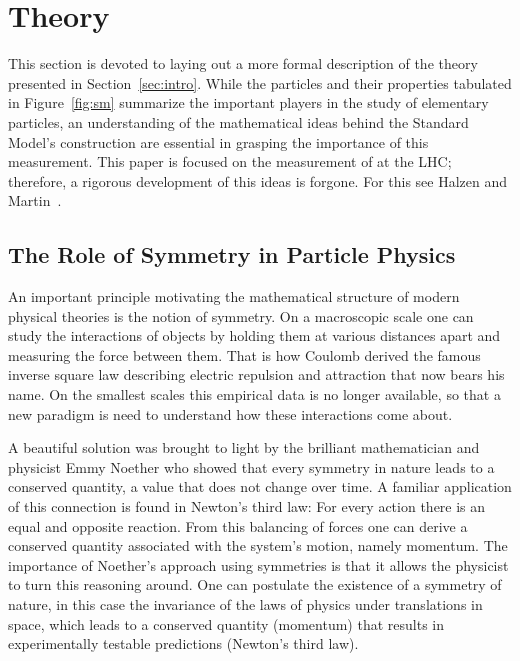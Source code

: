 \section{Theory}
\label{sec:theory}

This section is devoted to laying out a more formal description of the
theory presented in Section~\ref{sec:intro}. While the particles and
their properties tabulated in Figure~\ref{fig:sm} summarize the important
players in the study of elementary particles, an understanding of the
mathematical ideas behind the Standard Model's construction are essential in grasping
the importance of this measurement. This paper is focused on the measurement
of \HToZg at the LHC; therefore, a rigorous development of this ideas is forgone. 
For this see Halzen and Martin~\cite{QuarksLeptons}.



\subsection{The Role of Symmetry in Particle Physics}
\label{subsec:symmetry}

An important principle motivating the mathematical structure of modern physical 
theories is the notion of symmetry. On a macroscopic scale one can study
the interactions of objects by holding them at various
distances apart and measuring the force between them. That is how Coulomb derived
the famous inverse square law describing electric repulsion and attraction that
now bears his name. On the smallest scales this empirical data is no longer
available, so that a new paradigm is need to understand how these interactions
come about. 

A beautiful solution was brought to light by the brilliant 
mathematician and physicist Emmy Noether who showed that every symmetry in
nature leads to a conserved quantity, a value that does not change over time.
A familiar application of this connection is found in Newton's third law:
For every action there is an equal and opposite reaction. From this balancing of
forces one can derive a conserved quantity associated with the system's 
motion, namely momentum. The importance of Noether's approach using symmetries
is that it allows the physicist to turn this reasoning around. One can postulate
the existence of a symmetry of nature, in this case the invariance of the laws
of physics under translations in space, which leads to a conserved quantity (momentum)
that results in experimentally testable predictions (Newton's third law).

